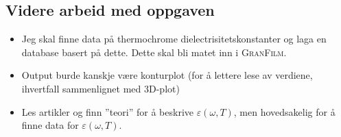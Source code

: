 \subsection{Videre arbeid med oppgaven}
\begin{itemize}
\item Jeg skal finne data på thermochrome dielectrisitetskonstanter og laga en database basert på dette.
   Dette skal bli matet inn i \textsc{GranFilm}.
\item Output burde kanskje være konturplot (for å lettere lese av verdiene, ihvertfall sammenlignet med 3D-plot)
\item Les artikler og finn ''teori'' for å beskrive $\varepsilon(\omega, T)$, men hovedsakelig for å
finne data for $\varepsilon(\omega, T)$.
\end{itemize}
